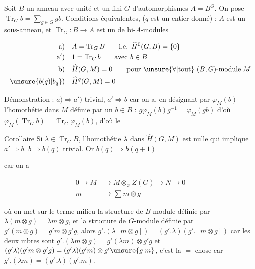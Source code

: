 
Soit $B$ un anneau avec unité et un  fini $G$ d'automorphismes $A=B^G$. On pose $\operatorname{Tr}_G b=\sum_{g\in G}gb$. Conditions équivalentes, ($q$ est un entier donné) : $A$ est un sous-anneau, et $\operatorname{Tr}_G:B\to A$ est un  de bi-$A$-modules


\[
\begin{aligned}
\text{a)}\quad & A=\operatorname{Tr}_G B\qquad\text{i.e. }\widehat H^0(G,B)=\{0\}\\
\text{a$'$)}\quad & 1=\operatorname{Tr}_G b\qquad\text{avec }b\in B\\
\text{b)}\quad & \widehat H(G,M)=0\qquad\text{pour }\unsure{\forall|\text{tout}}\ (B,G)\text{-module }M\\
\unsure{b(q)|b_q}\text{)}\quad & \widehat H^q(G,M)=0
\end{aligned}
\]

Démonstration : $a)\Longrightarrow a')$ trivial, $a'\Longrightarrow b$ car on a, en désignant par $\varphi_M(b)$ l'homothétie dans $M$ définie par un $b\in B$ : $g\varphi_M(b)g^{-1}=\varphi_M(gb)$ d'où $\varphi_M(\operatorname{Tr}_G b)=\operatorname{Tr}_G\varphi_M(b)$, d'où le

\uline{Corollaire} Si $\lambda\in\operatorname{Tr}_G B$, l'homothétie $\lambda$ dans $\widehat H(G,M)$ est \uline{nulle} \inserted{[et la condition est \unsure{manifeste\textsuperscript{t}|manifestement} nécessaire, en prenant $M=\underline B$)} qui implique $a'\Longrightarrow b$. $b\Longrightarrow b(q)$ trivial. Or $b(q)\Longrightarrow b(q+1)$

car on a

\[
\begin{aligned}
0\to M&\to M\otimes_Z Z(G)\to N\to 0\\[-2pt]
m&\to\textstyle\sum m\otimes g
\end{aligned}
\]

où on met sur le terme milieu la structure de $B$-module définie par $\lambda(m\otimes g)=\lambda m\otimes g$, et la structure de $G$-module définie par $g'(m\otimes g)=g'm\otimes g'g$, alors $g'.(\lambda[m\otimes g])=(g'.\lambda)(g'.[m\otimes g])$ car les deux mbres sont  $g'.(\lambda m\otimes g)=g'(\lambda m)\otimes g'g$ et $(g'\lambda)(g'm\otimes g'g)=(g'\lambda)(g'm)\otimes g'\unsure{g|m}$, c'est la $=$ chose car $g'.(\lambda m)=(g'.\lambda)(g'.m)$.

